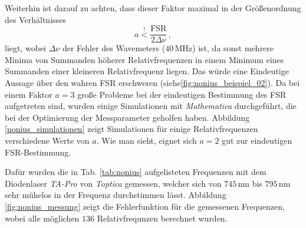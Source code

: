 Weiterhin ist darauf zu achten, dass dieser Faktor maximal in der Größenordnung
des Verhältnisses
\begin{equation}\label{eq:nonius_faktor}
	a\stackrel{!}{<}\frac{\text{FSR}}{2\Delta\nu}\,,
\end{equation}
liegt, wobei $\Delta\nu$ der Fehler des Wavemeters ($40\,$MHz) ist, da sonst
mehrere Minima von Summanden höherer Relativfrequenzen in einem Minimum
eines Summanden einer kleineren Relativfrequenz liegen. Das würde eine
Eindeutige Aussage über den wahren FSR erschweren
(siehe\ref{fig:nonius_beispiel_02}).
Da bei einem Faktor $a=3$ große Probleme bei der eindeutigen Bestimmung des FSR
aufgetreten sind, wurden einige Simulationen mit \textit{Mathematica}
durchgeführt, die bei der Optimierung der Messparameter geholfen haben.
Abbildung \ref{nonius_simulationen} zeigt Simulationen für einige
Relativfrequenzen verschiedene Werte von $a$. Wie man sieht, eignet sich $a=2$
gut zur eindeutigen FSR-Bestimmung.\par
Dafür wurden die in Tab. \ref{tab:nonius} aufgelisteten Frequenzen mit dem
Diodenlaser \textit{TA-Pro} von \textit{Toptica} gemessen, welcher sich
von $745\,$nm bis $795\,$nm sehr mühelos in der Frequenz durchstimmen lässt.
Abbildung \ref{fig:nonius_messung} zeigt die Fehlerfunktion für die gemessenen
Frequenzen, wobei alle möglichen $136$ Relativfrequnzen berechnet wurden.
